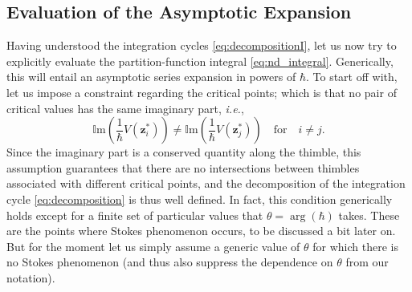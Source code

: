 \documentclass[11pt,a4paper]{article}
\newcommand{\be}{\begin{equation}}
\newcommand{\ee}{\end{equation}}
\def\im{{\mathbb{I}}{\mathrm{m}}}
\begin{document}
\subsection*{Evaluation of the Asymptotic Expansion}

Having understood the integration cycles \eqref{eq:decompositionI}, let us now try to explicitly evaluate the partition-function integral \eqref{eq:nd_integral}. Generically, this will entail an asymptotic series expansion in powers of $\hbar$. To start off with, let us impose a constraint regarding the critical points; which is that no pair of critical values has the same imaginary part, \textit{i.e.},
%
\be
\label{impotentialij}
\im \left( \frac{1}{\hbar} V (\boldsymbol{z}^*_i) \right) \neq \im \left( \frac{1}{\hbar} V (\boldsymbol{z}^*_j) \right) \quad \text{for} \quad i\neq j.
\ee
%
\noindent
Since the imaginary part is a conserved quantity along the thimble, this assumption guarantees that there are no intersections between thimbles associated with different critical points, and the decomposition of the integration cycle \eqref{eq:decomposition} is thus well defined. In fact, this condition generically holds except for a finite set of particular values that $\theta = \arg (\hbar)$ takes. These are the points where Stokes phenomenon occurs, to be discussed a bit later on. But for the moment let us simply assume a generic value of $\theta$ for which there is no Stokes phenomenon (and thus also suppress the dependence on $\theta$ from our notation).
\end{document}
